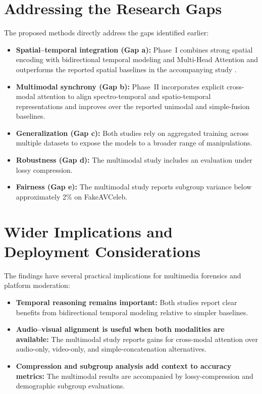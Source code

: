 \section{Addressing the Research Gaps}
The proposed methods directly address the gaps identified earlier:
\begin{itemize}
    \item \textbf{Spatial--temporal integration (Gap a):} Phase~I combines strong spatial encoding with bidirectional temporal modeling and Multi-Head Attention and outperforms the reported spatial baselines in the accompanying study \cite{rossler2019faceforensics,afchar2018mesonet}.
    \item \textbf{Multimodal synchrony (Gap b):} Phase~II incorporates explicit cross-modal attention to align spectro-temporal and spatio-temporal representations and improves over the reported unimodal and simple-fusion baselines.
    \item \textbf{Generalization (Gap c):} Both studies rely on aggregated training across multiple datasets to expose the models to a broader range of manipulations.
    \item \textbf{Robustness (Gap d):} The multimodal study includes an evaluation under lossy compression.
    \item \textbf{Fairness (Gap e):} The multimodal study reports subgroup variance below approximately 2\% on FakeAVCeleb.
\end{itemize}

\section{Wider Implications and Deployment Considerations}
The findings have several practical implications for multimedia forensics and platform moderation:
\begin{itemize}
    \item \textbf{Temporal reasoning remains important:} Both studies report clear benefits from bidirectional temporal modeling relative to simpler baselines.
    \item \textbf{Audio--visual alignment is useful when both modalities are available:} The multimodal study reports gains for cross-modal attention over audio-only, video-only, and simple-concatenation alternatives.
    \item \textbf{Compression and subgroup analysis add context to accuracy metrics:} The multimodal results are accompanied by lossy-compression and demographic subgroup evaluations.
\end{itemize}

